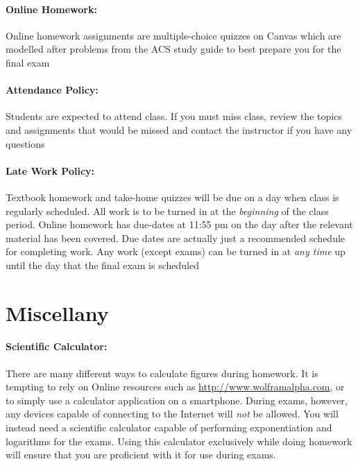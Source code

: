 \documentclass[12pt, letterpaper]{article}
\begin{document}
\paragraph{Online Homework:}
Online homework assignments are multiple-choice quizzes on Canvas which are modelled after problems from the ACS study guide to best prepare you for the final exam

\paragraph{Attendance Policy:}
Students are expected to attend class. If you must miss class, review the topics and assignments that would be missed and contact the instructor if you have any questions

\paragraph{Late Work Policy:}
Textbook homework and take-home quizzes will be due on a day when class is regularly scheduled. All work is to be turned in at the \emph{beginning} of the class period. Online homework has due-dates at 11:55 pm on the day after the relevant material has been covered. Due dates are actually just a recommended schedule for completing work. Any work (except exams) can be turned in at \emph{any time} up until the day that the final exam is scheduled


\section*{Miscellany}
\paragraph{Scientific Calculator:}
There are many different ways to calculate figures during homework. It is tempting to rely on Online resources such as \href{http://www.wolframalpha.com}{http://www.wolframalpha.com}, or to simply use a calculator application on a smartphone. During exams, however, any devices capable of connecting to the Internet will \emph{not} be allowed. You will instead need a scientific calculator capable of performing exponentiation and logarithms for the exams. Using this calculator exclusively while doing homework will ensure that you are proficient with it for use during exams.
\end{document}
